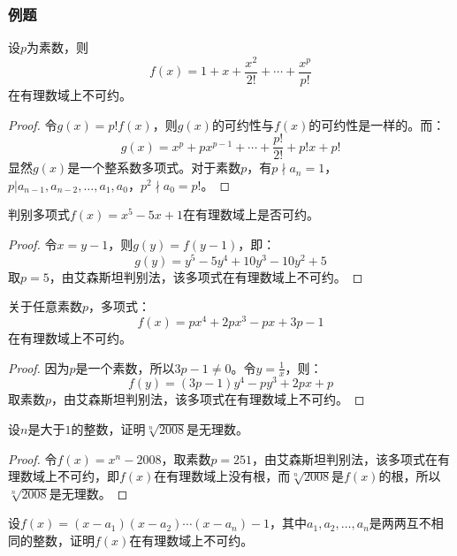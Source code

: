 \subsubsection{例题}
\begin{theorem}
	设$p$为素数，则
	\begin{equation*}
		f(x)=1+x+\frac{x^2}{2!}+\cdots+\frac{x^p}{p!}
	\end{equation*}
	在有理数域上不可约。
\end{theorem}
\begin{proof}
	令$g(x)=p!f(x)$，则$g(x)$的可约性与$f(x)$的可约性是一样的。而：
	\begin{equation*}
		g(x)=x^p+px^{p-1}+\cdots+\frac{p!}{2!}+p!x+p!
	\end{equation*}
	显然$g(x)$是一个整系数多项式。对于素数$p$，有$p\nmid a_n=1$，$p|a_{n-1},a_{n-2},\dots,a_1,a_0$，$p^2\nmid a_0=p!$。
\end{proof}
\begin{theorem}
	判别多项式$f(x)=x^5-5x+1$在有理数域上是否可约。
\end{theorem}
\begin{proof}
	令$x=y-1$，则$g(y)=f(y-1)$，即：
	\begin{equation*}
		g(y)=y^5-5y^4+10y^3-10y^2+5
	\end{equation*}
	取$p=5$，由艾森斯坦判别法，该多项式在有理数域上不可约。
\end{proof}
\begin{theorem}
	关于任意素数$p$，多项式：
	\begin{equation*}
		f(x)=px^4+2px^3-px+3p-1
	\end{equation*}
	在有理数域上不可约。
\end{theorem}
\begin{proof}
	因为$p$是一个素数，所以$3p-1\ne0$。令$y=\frac{1}{x}$，则：
	\begin{equation*}
		f(y)=(3p-1)y^4-py^3+2px+p
	\end{equation*}
	取素数$p$，由艾森斯坦判别法，该多项式在有理数域上不可约。
\end{proof}
\begin{theorem}
	设$n$是大于$1$的整数，证明$\sqrt[n]{2008}$是无理数。
\end{theorem}
\begin{proof}
	令$f(x)=x^n-2008$，取素数$p=251$，由艾森斯坦判别法，该多项式在有理数域上不可约，即$f(x)$在有理数域上没有根，而$\sqrt[n]{2008}$是$f(x)$的根，所以$\sqrt[n]{2008}$是无理数。
\end{proof}
\begin{theorem}
	设$f(x)=(x-a_1)(x-a_2)\cdots(x-a_n)-1$，其中$a_1,a_2,\dots,a_n$是两两互不相同的整数，证明$f(x)$在有理数域上不可约。
\end{theorem}
